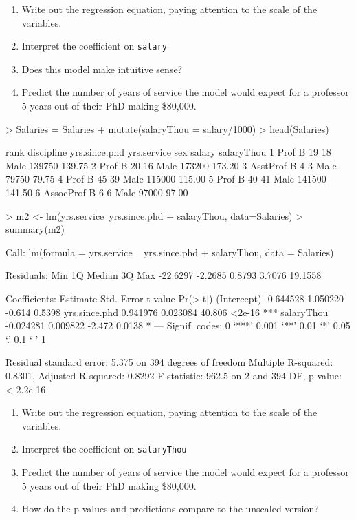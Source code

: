\documentclass[10pt]{article}
\begin{document}
\begin{enumerate}
  \itemsep0.5in
  \item Write out the regression equation, paying attention to the scale of the variables. 
  \item Interpret the coefficient on \verb#salary#
  \item Does this model make intuitive sense?
  \item Predict the number of years of service the model would expect for a professor 5 years out of their PhD making \$80,000. 
  \vspace{0.5in}
\end{enumerate}

\begin{Schunk}
\begin{Sinput}
> Salaries = Salaries %>%
+   mutate(salaryThou = salary/1000)
> head(Salaries)
\end{Sinput}
\begin{Soutput}
       rank discipline yrs.since.phd yrs.service  sex salary salaryThou
1      Prof          B            19          18 Male 139750     139.75
2      Prof          B            20          16 Male 173200     173.20
3  AsstProf          B             4           3 Male  79750      79.75
4      Prof          B            45          39 Male 115000     115.00
5      Prof          B            40          41 Male 141500     141.50
6 AssocProf          B             6           6 Male  97000      97.00
\end{Soutput}
\begin{Sinput}
> m2 <- lm(yrs.service~yrs.since.phd + salaryThou, data=Salaries)
> summary(m2)
\end{Sinput}
\begin{Soutput}
Call:
lm(formula = yrs.service ~ yrs.since.phd + salaryThou, data = Salaries)

Residuals:
     Min       1Q   Median       3Q      Max 
-22.6297  -2.2685   0.8793   3.7076  19.1558 

Coefficients:
               Estimate Std. Error t value Pr(>|t|)    
(Intercept)   -0.644528   1.050220  -0.614   0.5398    
yrs.since.phd  0.941976   0.023084  40.806   <2e-16 ***
salaryThou    -0.024281   0.009822  -2.472   0.0138 *  
---
Signif. codes:  0 ‘***’ 0.001 ‘**’ 0.01 ‘*’ 0.05 ‘.’ 0.1 ‘ ’ 1

Residual standard error: 5.375 on 394 degrees of freedom
Multiple R-squared:  0.8301,	Adjusted R-squared:  0.8292 
F-statistic: 962.5 on 2 and 394 DF,  p-value: < 2.2e-16
\end{Soutput}
\end{Schunk}

\begin{enumerate}
  \itemsep0.5in
  \item Write out the regression equation, paying attention to the scale of the variables. 
  \item Interpret the coefficient on \verb#salaryThou#
  \item Predict the number of years of service the model would expect for a professor 5 years out of their PhD making \$80,000. 
  \item How do the p-values and predictions compare to the unscaled version?
\end{enumerate}
\end{document}
